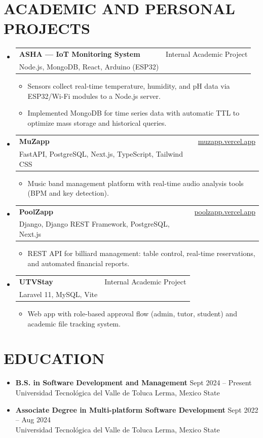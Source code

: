 \documentclass[letterpaper,11pt]{article}
\makeatletter
\newcommand{\resumeSubheading}[4]{
    \vspace{-1pt}\item
      \begin{tabular*}{0.97\textwidth}[t]{l@{\extracolsep{\fill}}r}
        \textbf{#1} & \small #2 \\
        \small#3 & \small #4 \\
      \end{tabular*}\vspace{-6pt}
  }
\newcommand{\resumeItemListStart}{\begin{itemize}[leftmargin=0.15in, label={$\circ$}]}
\newcommand{\resumeItemListEnd}{\end{itemize}\vspace{-3pt}}
\makeatother
\begin{document}
  \section{ACADEMIC AND PERSONAL PROJECTS}
    \begin{itemize}[leftmargin=0.15in, label={}]
      \resumeSubheading
        {ASHA — IoT Monitoring System}{Internal Academic Project}
        {Node.js, MongoDB, React, Arduino (ESP32)}{}
        \resumeItemListStart
          \item Sensors collect real-time temperature, humidity, and pH data via ESP32/Wi-Fi modules to a Node.js server.
          \item Implemented MongoDB for time series data with automatic TTL to optimize mass storage and historical queries.
        \resumeItemListEnd

      \resumeSubheading
        {MuZapp}{\href{https://muzapp.vercel.app}{muzapp.vercel.app}}
        {FastAPI, PostgreSQL, Next.js, TypeScript, Tailwind CSS}{}
        \resumeItemListStart
          \item Music band management platform with real-time audio analysis tools (BPM and key detection).
        \resumeItemListEnd

      \resumeSubheading
        {PoolZapp}{\href{https://poolzapp.vercel.app}{poolzapp.vercel.app}}
        {Django, Django REST Framework, PostgreSQL, Next.js}{}
        \resumeItemListStart
          \item REST API for billiard management: table control, real-time reservations, and automated financial reports.
        \resumeItemListEnd

      \resumeSubheading
        {UTVStay}{Internal Academic Project}
        {Laravel 11, MySQL, Vite}{}
        \resumeItemListStart
          \item Web app with role-based approval flow (admin, tutor, student) and academic file tracking system.
        \resumeItemListEnd
    \end{itemize}

  \vspace{-5pt}

  \section{EDUCATION}
    \begin{itemize}[leftmargin=0.15in, label={}]
      \item \textbf{B.S. in Software Development and Management} \hfill Sept 2024 -- Present \\
      Universidad Tecnológica del Valle de Toluca \hfill Lerma, Mexico State
      \vspace{2pt}
      \item \textbf{Associate Degree in Multi-platform Software Development} \hfill Sept 2022 -- Aug 2024 \\
      Universidad Tecnológica del Valle de Toluca \hfill Lerma, Mexico State
    \end{itemize}
\end{document}
